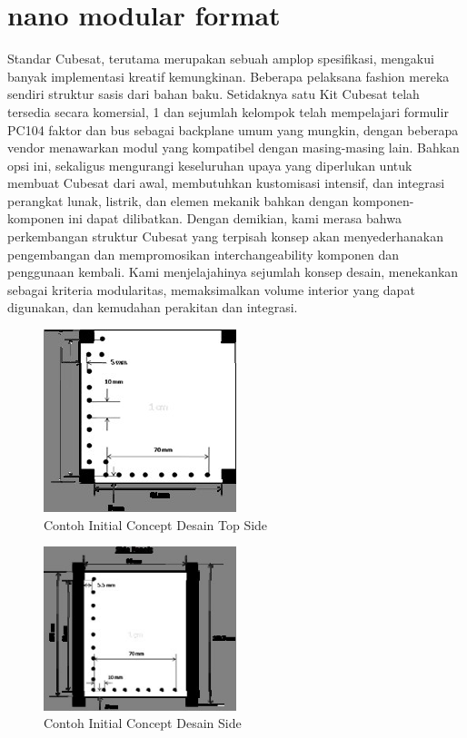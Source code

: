 \section{nano modular format}
Standar Cubesat, terutama merupakan sebuah amplop spesifikasi, mengakui banyak implementasi kreatif kemungkinan. Beberapa pelaksana fashion mereka sendiri struktur sasis dari bahan baku. Setidaknya satu Kit Cubesat telah tersedia secara komersial, 1 dan sejumlah kelompok telah mempelajari formulir PC104 faktor dan bus sebagai backplane umum yang mungkin, dengan beberapa vendor menawarkan modul yang kompatibel dengan masing-masing lain. Bahkan opsi ini, sekaligus mengurangi keseluruhan upaya yang diperlukan untuk membuat Cubesat dari awal, membutuhkan kustomisasi intensif, dan integrasi perangkat lunak, listrik, dan elemen mekanik bahkan dengan komponen-komponen ini dapat dilibatkan. Dengan demikian, kami merasa bahwa perkembangan struktur Cubesat yang terpisah konsep akan menyederhanakan pengembangan dan mempromosikan interchangeability komponen dan penggunaan kembali. Kami menjelajahinya sejumlah konsep desain, menekankan sebagai kriteria modularitas, memaksimalkan volume interior yang dapat digunakan, dan kemudahan perakitan dan integrasi.

  \begin{figure}[ht]
\centerline{\includegraphics[width=0.5\textwidth]{figures/Aninitialconceptdesigntop.jpg}}
  \caption{Contoh Initial Concept Desain Top Side}
  \label{Aninitialconceptdesigntop}
  \end{figure}

  \begin{figure}[ht]
\centerline{\includegraphics[width=0.5\textwidth]{figures/Aninitialconceptdesignside.jpg}}
  \caption{Contoh Initial Concept Desain Side}
  \label{Aninitialconceptdesignside}
  \end{figure}

